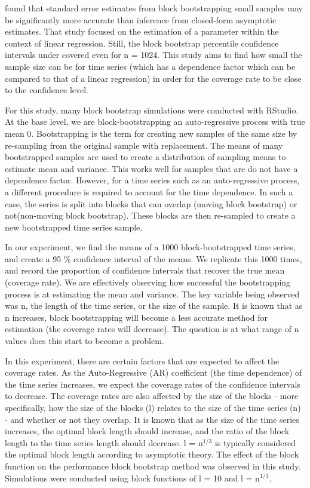 \documentclass[12pt, letterpaper, titlepage]{article}
\begin{document}
\citet{goncalves2005bootstrap} found that standard error estimates from block bootstrapping small 
samples 
may be significantly more accurate than inference from closed-form asymptotic estimates. That study focused on the estimation of a parameter within the context of linear regression. Still, the block bootstrap percentile confidence intervals under covered even for n = 1024. This study aims to find how small the sample size can be for time series (which has a dependence factor which can be compared to that of a linear regression) in order for the coverage rate to be close to the confidence level.

For this study, many block bootstrap simulations were conducted with RStudio. At the base
level, we are block-bootstrapping an auto-regressive process with true mean 0.
Bootstrapping is the term for creating new samples of the same size by re-sampling from
the original sample with replacement. The means of many bootstrapped samples are used to create a
distribution of sampling means to estimate mean and variance. This works well for samples
that are do not have a dependence factor. However, for a time series such as an auto-regressive process,
a different procedure is required to account for the time dependence. In such a case,
the series is split into blocks that can overlap (moving block bootstrap) or not(non-moving block bootstrap). These blocks are then re-sampled to create a new
bootstrapped time series sample. 

In our experiment, we find the means of a 1000 block-bootstrapped time series, 
and create a 95 \% confidence interval of the means. We replicate this 1000 times, 
and record the proportion of confidence intervals that recover the true mean 
(coverage rate). We are effectively observing how successful the bootstrapping process
is at estimating the mean and variance. The key variable being observed was n, 
the length of the time series, or the size of the sample. It is known that as n
increases, block bootstrapping will become a less accurate method for estimation
(the coverage rates will decrease). The question is at what range of n values does this
start to become a problem. 

In this experiment, there are certain factors that are expected to affect the coverage
rates. As the Auto-Regressive (AR) coefficient (the time dependence) of the time series 
increases,
we expect the coverage rates of the confidence intervals to decrease.
The coverage rates are also affected by the size of the blocks - more specifically,
how the size of the blocks (l) relates to the size of the time series (n) - 
and whether or not they overlap. It is known that as the size of the time series 
increases, the optimal block length should increase, and the ratio of the block length to 
the time series length should decrease. l = n$^{1/3}$ is typically considered the optimal 
block length according to asymptotic theory. \citep{buhlmann1999block} The effect of the block function on the performance block bootstrap method was observed in this study. Simulations were conducted using block functions of l = 10 and l = n$^{1/3}$. 
\end{document}
